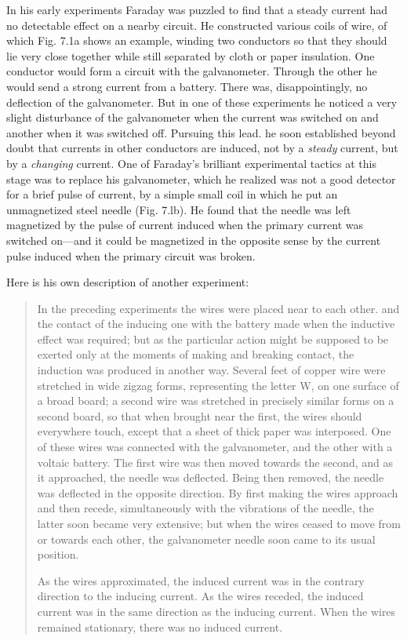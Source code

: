 In his early experiments Faraday was puzzled to find that a steady
current had no detectable effect on a nearby circuit. He constructed
various coils of wire, of which Fig. 7.1a shows an example, winding
two conductors so that they should lie very close together while still
separated by cloth or paper insulation. One conductor would form
a circuit with the galvanometer. Through the other he would send
a strong current from a battery. There was, disappointingly, no 
deflection of the galvanometer. But in one of these experiments he
noticed a very slight disturbance of the galvanometer when the current
was switched on and another when it was switched off. Pursuing
this lead. he soon established beyond doubt that currents in other
conductors are induced, not by a \emph{steady} current, but by a \emph{changing}
current. One of Faraday's brilliant experimental tactics at this stage
was to replace his galvanometer, which he realized was not a good
detector for a brief pulse of current, by a simple small coil in which
he put an unmagnetized steel needle (Fig. 7.lb). He found that the
needle was left magnetized by the pulse of current induced when the
primary current was switched on---and it could be magnetized in the
opposite sense by the current pulse induced when the primary circuit
was broken.

Here is his own description of another experiment:

\begin{quotation}
In the preceding experiments the wires were placed near to each other.
and the contact of the inducing one with the battery made when the inductive
effect was required; but as the particular action might be supposed to be
exerted only at the moments of making and breaking contact, the induction
was produced in another way. Several feet of copper wire were stretched
in wide zigzag forms, representing the letter W, on one surface of a broad
board; a second wire was stretched in precisely similar forms on a second
board, so that when brought near the first, the wires should everywhere
touch, except that a sheet of thick paper was interposed. One of these wires
was connected with the galvanometer, and the other with a voltaic battery.
The first wire was then moved towards the second, and as it approached, the
needle was deflected. Being then removed, the needle was deflected in the
opposite direction. By first making the wires approach and then recede,
simultaneously with the vibrations of the needle, the latter soon became very
extensive; but when the wires ceased to move from or towards each other,
the galvanometer needle soon came to its usual position.

As the wires approximated, the induced current was in the contrary direction
to the inducing current. As the wires receded, the induced current was
in the same direction as the inducing current. When the wires remained
stationary, there was no induced current.
\end{quotation}

